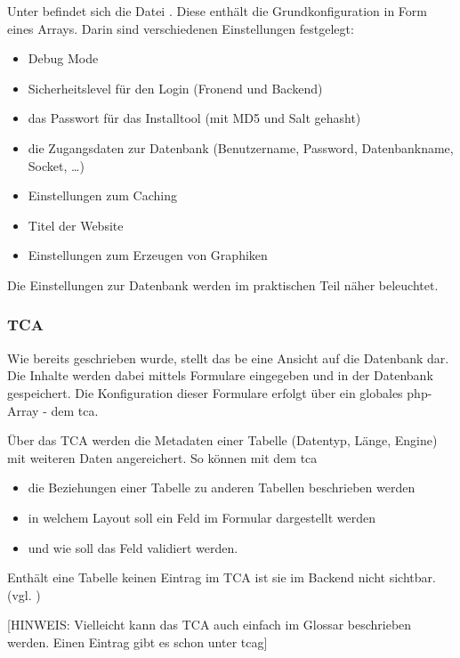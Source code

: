 Unter  befindet sich die Datei . Diese enthält die Grundkonfiguration in Form eines Arrays. Darin sind verschiedenen Einstellungen festgelegt:
\begin{itemize}
	\item Debug Mode
	\item Sicherheitslevel für den Login (Fronend und Backend)
	\item das Passwort für das Installtool (mit MD5 und Salt gehasht)
	\item die Zugangsdaten zur Datenbank (Benutzername, Password, Datenbankname, Socket, …)
	\item Einstellungen zum Caching
	\item Titel der Website
	\item Einstellungen zum Erzeugen von Graphiken
\end{itemize}

Die Einstellungen zur Datenbank werden im praktischen Teil näher beleuchtet.

\subsubsection{TCA}

Wie bereits geschrieben wurde, stellt das \gls{be} eine Ansicht auf die Datenbank dar. Die Inhalte werden dabei mittels Formulare eingegeben und in der Datenbank gespeichert. Die Konfiguration dieser Formulare erfolgt über ein globales \gls{php}-Array - dem \gls{tca}.

Über das TCA werden die Metadaten einer Tabelle (Datentyp, Länge, Engine) mit weiteren Daten angereichert. So können mit dem \gls{tca}

\begin{itemize}
	\itemsep1pt\parskip0pt
	\item
		die Beziehungen einer Tabelle zu anderen Tabellen beschrieben werden
	\item
		in welchem Layout soll ein Feld im Formular dargestellt werden
	\item
		und wie soll das Feld validiert werden.
\end{itemize}

Enthält eine Tabelle keinen Eintrag im TCA ist sie im Backend nicht sichtbar.(vgl. \cite{web:typo3TCA})

[HINWEIS: Vielleicht kann das TCA auch einfach im Glossar beschrieben werden. Einen Eintrag gibt es schon unter tcag]

